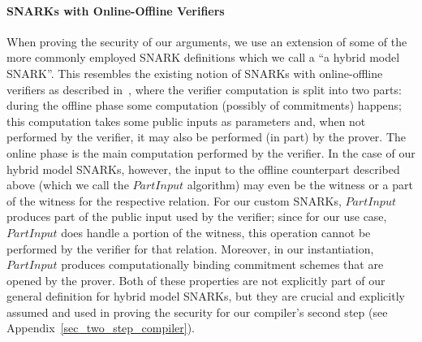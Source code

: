\paragraph{SNARKs with Online-Offline Verifiers} When proving the security of our arguments, we use an extension of some of the more commonly employed SNARK definitions which we call a ``a hybrid model SNARK''. This resembles the existing notion of SNARKs with online-offline verifiers as described in~\cite{HP_paper}, where the verifier computation is split into 
two parts: during the offline phase some computation (possibly of commitments) happens; this computation takes some public inputs as parameters and, when not 
performed by the verifier, it may also be performed (in part) by the prover. The online phase is the main computation performed by the verifier. In the case of our hybrid 
model SNARKs, however, the input to the offline counterpart described above (which we call the $\mathit{PartInput}$ algorithm) may even be the witness or 
a part of the witness for the respective relation. For our custom SNARKs, $\mathit{PartInput}$ produces part of the public input used by the verifier; 
since for our use case, $\mathit{PartInput}$ does handle a portion of the witness, this operation cannot be performed by the verifier for that relation. 
Moreover, in our instantiation, $\mathit{PartInput}$ produces computationally binding commitment schemes that are opened by the prover. Both of these properties 
are not explicitly part of our general definition for hybrid model SNARKs, but they are crucial and explicitly assumed and used 
in proving the security for our compiler's second step (see Appendix~\ref{sec_two_step_compiler}).

\vspace{-0.1in}

%



